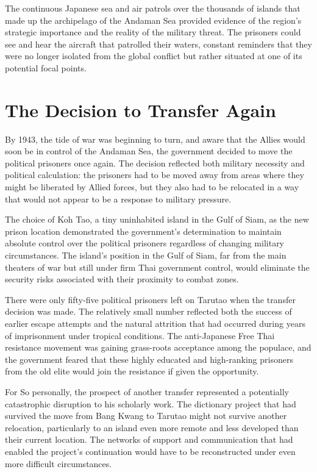 \documentclass[
  Letterpaper,
]{scrbook}
\begin{document}
The continuous Japanese sea and air patrols over the thousands of
islands that made up the archipelago of the Andaman Sea provided
evidence of the region's strategic importance and the reality of the
military threat. The prisoners could see and hear the aircraft that
patrolled their waters, constant reminders that they were no longer
isolated from the global conflict but rather situated at one of its
potential focal points.

\section{The Decision to Transfer
Again}\label{the-decision-to-transfer-again}

By 1943, the tide of war was beginning to turn, and aware that the
Allies would soon be in control of the Andaman Sea, the government
decided to move the political prisoners once again. The decision
reflected both military necessity and political calculation: the
prisoners had to be moved away from areas where they might be liberated
by Allied forces, but they also had to be relocated in a way that would
not appear to be a response to military pressure.

The choice of Koh Tao, a tiny uninhabited island in the Gulf of Siam, as
the new prison location demonstrated the government's determination to
maintain absolute control over the political prisoners regardless of
changing military circumstances. The island's position in the Gulf of
Siam, far from the main theaters of war but still under firm Thai
government control, would eliminate the security risks associated with
their proximity to combat zones.

There were only fifty-five political prisoners left on Tarutao when the
transfer decision was made. The relatively small number reflected both
the success of earlier escape attempts and the natural attrition that
had occurred during years of imprisonment under tropical conditions. The
anti-Japanese Free Thai resistance movement was gaining grass-roots
acceptance among the populace, and the government feared that these
highly educated and high-ranking prisoners from the old elite would join
the resistance if given the opportunity.

For So personally, the prospect of another transfer represented a
potentially catastrophic disruption to his scholarly work. The
dictionary project that had survived the move from Bang Kwang to Tarutao
might not survive another relocation, particularly to an island even
more remote and less developed than their current location. The networks
of support and communication that had enabled the project's continuation
would have to be reconstructed under even more difficult circumstances.
\end{document}
